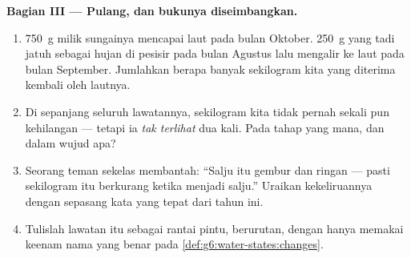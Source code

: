 \begin{problem}
\medskip\noindent\textbf{Bagian III --- Pulang, dan bukunya
diseimbangkan.}
\begin{enumerate}[resume]
  \item \qty{750}{g} milik sungainya mencapai laut pada bulan
        Oktober. \qty{250}{g} yang  tadi jatuh sebagai hujan
        di pesisir pada bulan Agustus lalu mengalir ke laut pada
        bulan September. Jumlahkan berapa banyak sekilogram kita yang
        diterima kembali oleh lautnya.
  \item Di sepanjang seluruh lawatannya, sekilogram kita tidak pernah
        sekali pun kehilangan  --- tetapi ia \emph{tak
        terlihat} dua kali. Pada tahap yang mana, dan dalam wujud
        apa?
  \item Seorang teman sekelas membantah: ``Salju itu gembur dan
        ringan --- pasti sekilogram itu  berkurang ketika
        menjadi salju.'' Uraikan kekeliruannya dengan sepasang kata
        yang tepat dari tahun ini.
  \item Tulislah lawatan itu sebagai rantai pintu, berurutan, dengan
        hanya memakai keenam nama yang benar pada
        \cref{def:g6:water-states:changes}.
\end{enumerate}
\end{problem}

